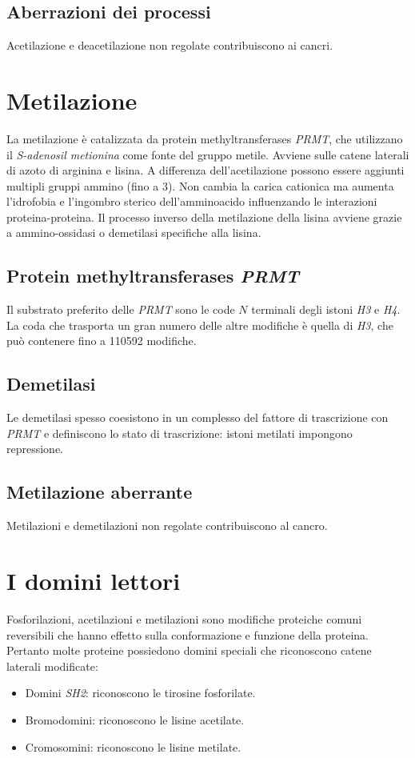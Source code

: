 	\subsection{Aberrazioni dei processi}
	Acetilazione e deacetilazione non regolate contribuiscono ai cancri. 

\section{Metilazione}
La metilazione \`e catalizzata da protein methyltransferases \emph{PRMT}, che utilizzano il \emph{S-adenosil metionina} come fonte del gruppo metile.
Avviene sulle catene laterali di azoto di arginina e lisina.
A differenza dell'acetilazione possono essere aggiunti multipli gruppi ammino (fino a $3$).
Non cambia la carica cationica ma aumenta l'idrofobia e l'ingombro sterico dell'amminoacido influenzando le interazioni proteina-proteina.
Il processo inverso della metilazione della lisina avviene grazie a ammino-ossidasi o demetilasi specifiche alla lisina. 
	
	\subsection{Protein methyltransferases \emph{PRMT}}
	Il substrato preferito delle \emph{PRMT} sono le code $N$ terminali degli istoni \emph{H3} e \emph{H4}. 
	La coda che trasporta un gran numero delle altre modifiche \`e quella di \emph{H3}, che pu\`o contenere fino a \num{110592} modifiche. 

	\subsection{Demetilasi}
	Le demetilasi spesso coesistono in un complesso del fattore di trascrizione con \emph{PRMT} e definiscono lo stato di trascrizione: istoni metilati impongono repressione. 
	
	\subsection{Metilazione aberrante}
	Metilazioni e demetilazioni non regolate contribuiscono al cancro.

\section{I domini lettori}
Fosforilazioni, acetilazioni e metilazioni sono modifiche proteiche comuni reversibili che hanno effetto sulla conformazione e funzione della proteina. 
Pertanto molte proteine possiedono domini speciali che riconoscono catene laterali modificate:
\begin{itemize}
	\item Domini \emph{SH2}: riconoscono le tirosine fosforilate.
	\item Bromodomini: riconoscono le lisine acetilate.
	\item Cromosomini: riconoscono le lisine metilate.
\end{itemize}
	
